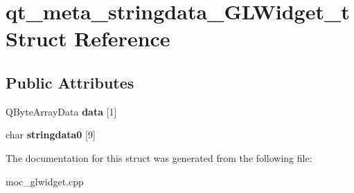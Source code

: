 \hypertarget{structqt__meta__stringdata___g_l_widget__t}{}\section{qt\+\_\+meta\+\_\+stringdata\+\_\+\+G\+L\+Widget\+\_\+t Struct Reference}
\label{structqt__meta__stringdata___g_l_widget__t}
\subsection*{Public Attributes}
\begin{DoxyCompactItemize}
\item 
\mbox{\label{structqt__meta__stringdata___g_l_widget__t_a4ea7c480aca4d340cb58d1fd0e89371d}} 
Q\+Byte\+Array\+Data {\bfseries data} \mbox{[}1\mbox{]}
\item 
\mbox{\label{structqt__meta__stringdata___g_l_widget__t_ac9d998717290969c8322bb09e72ed3a5}} 
char {\bfseries stringdata0} \mbox{[}9\mbox{]}
\end{DoxyCompactItemize}


The documentation for this struct was generated from the following file\+:\begin{DoxyCompactItemize}
\item 
moc\+\_\+glwidget.\+cpp\end{DoxyCompactItemize}
